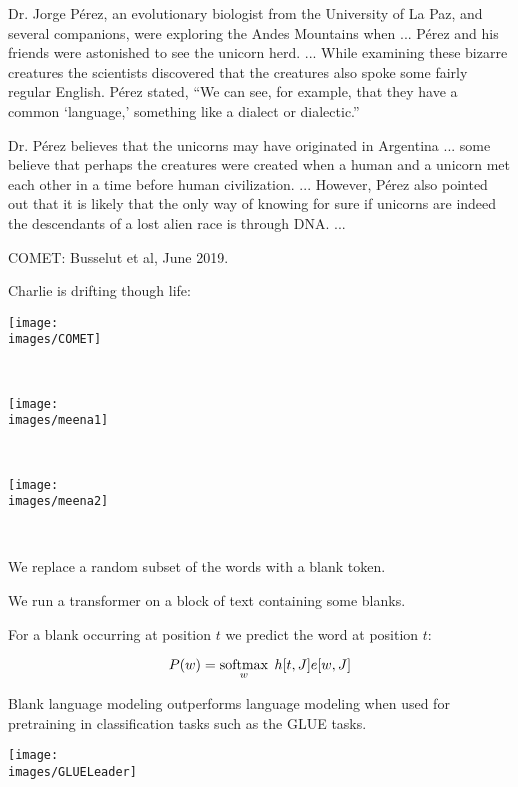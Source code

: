 {Dr. Jorge Pérez, an evolutionary biologist from the University of La Paz, and several companions, were exploring the Andes Mountains when ...
Pérez and his friends were astonished to see the unicorn herd. ...
While examining these bizarre creatures the scientists discovered that the creatures also spoke some fairly regular English. Pérez stated, “We can see, for example, that they have a common ‘language,’ something like a dialect or dialectic.”

Dr. Pérez believes that the unicorns may have originated in Argentina ... some believe that perhaps the creatures were created when a human and a unicorn met each other in a time before human civilization. ... However, Pérez also pointed out that it is likely that the only way of knowing for sure if unicorns are indeed the descendants of a lost alien race is through DNA. ...


COMET: Busselut et al, June 2019.

\vfill
Charlie is drifting though life:

\centerline{\texttt{[image: \\images/COMET]}}\


\centerline{\texttt{[image: \\images/meena1]}}\


\centerline{\texttt{[image: \\images/meena2]}}\


We replace a random subset of the words with a blank token.

\vfill
We run a transformer on a block of text containing some blanks.

\vfill
For a blank occurring at position $t$ we predict the word at position $t$:

\vfill
$$P(w) = \operatorname*{softmax}_w\;h[t,J]e[w,J]$$

\vfill
Blank language modeling outperforms language modeling when used for pretraining in classification tasks such as the GLUE tasks.


\centerline{\texttt{[image: \\images/GLUELeader]}}



}

